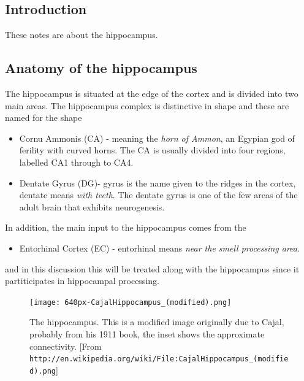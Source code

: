 \documentclass[11pt,a4paper]{scrartcl}
\begin{document}
\subsection*{Introduction}
These notes are about the hippocampus.

\subsection*{Anatomy of the hippocampus}

The hippocampus is situated at the edge of the cortex and is divided
into two main areas. The hippocampus complex is distinctive in shape
and these are named for the shape
\begin{itemize}
\item Cornu Ammonis (CA) - meaning the \textsl{horn of Ammon}, an
  Egypian god of ferility with curved horns. The CA is usually divided
  into four regions, labelled CA1 through to CA4.
\item Dentate Gyrus (DG)- gyrus is the name given to the ridges in the
  cortex, dentate means \textsl{with teeth}. The dentate gyrus is one
  of the few areas of the adult brain that exhibits neurogenesis.
\end{itemize}
In addition, the main input to the hippocampus comes from the
\begin{itemize}
\item Entorhinal Cortex (EC) - entorhinal means \textsl{near the smell processing area}. 
\end{itemize}
and in this discussion this will be treated along with the hippocampus
since it partiticipates in hippocampal processing.

\begin{figure}
\begin{center}
\texttt{[image: 640px-CajalHippocampus\_(modified).png]}
\end{center}
\caption{The hippocampus. This is a modified image originally due to
  Cajal, probably from his 1911 book, the inset shows the approximate
  connectivity. [From
    \texttt{http://en.wikipedia.org/wiki/File:CajalHippocampus\_(modified).png}]\label{fig:hippocampus}}
\end{figure}
\end{document}
